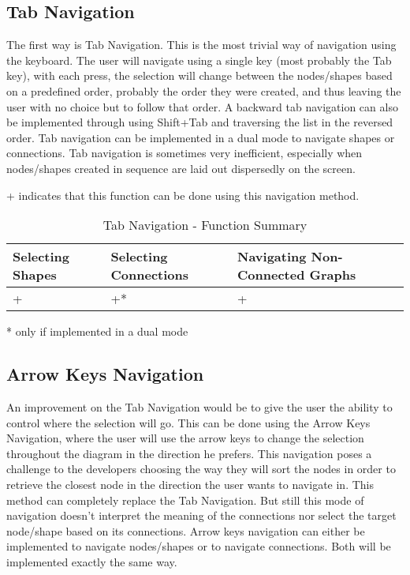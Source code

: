 \subsection{Tab Navigation}
The first way is Tab Navigation. This is the most trivial way of navigation using the keyboard. The user will navigate using a single key (most probably the Tab key), with each press, the selection will change between the nodes/shapes based on a predefined order, probably the order they were created, and thus leaving the user with no choice but to follow that order. A backward tab navigation can also be implemented through using Shift+Tab and traversing the list in the reversed order. Tab navigation can be implemented in a dual mode to navigate shapes or connections. Tab navigation is sometimes very inefficient, especially when nodes/shapes created in sequence are laid out dispersedly on the screen.

\begin{table}[H]
\begin{center}
\begin{flushleft}
\footnotesize
{+ indicates that this function can be done using this navigation method.}\\
\end{flushleft}
	\begin{tabular}{| l | l | l |}
	\hline
	Selecting Shapes & Selecting Connections & Navigating Non-Connected Graphs \\ \hline
	+ & +* & + \\ \hline
	\end{tabular}
\begin{flushleft}
\footnotesize
{* only if implemented in a dual mode}
\end{flushleft} 
\caption{Tab Navigation - Function Summary}
\end{center}
\end{table}

\subsection{Arrow Keys Navigation}
An improvement on the Tab Navigation would be to give the user the ability to control where the selection will go. This can be done using the Arrow Keys Navigation, where the user will use the arrow keys to change the selection throughout the diagram in the direction he prefers. This navigation poses a challenge to the developers choosing the way they will sort the nodes in order to retrieve the closest node in the direction the user wants to navigate in. This method can completely replace the Tab Navigation. But still this mode of navigation doesn't interpret the meaning of the connections nor select the target node/shape based on its connections.
Arrow keys navigation can either be implemented to navigate nodes/shapes or to navigate connections. Both will be implemented exactly the same way.

